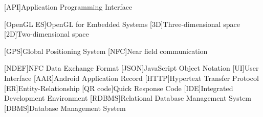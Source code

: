 [API]{Application Programming Interface}

[OpenGL ES]{OpenGL for Embedded Systems}
[3D]{Three-dimensional space}
[2D]{Two-dimensional space}

[GPS]{Global Positioning System}
[NFC]{Near field communication}

[NDEF]{NFC Data Exchange Format}
[JSON]{JavaScript Object Notation}
[UI]{User Interface}
[AAR]{Android Application Record}
[HTTP]{Hypertext Transfer Protocol}
[ER]{Entity-Relationship}
[QR code]{Quick Response Code}
[IDE]{Integrated Development Environment}
[RDBMS]{Relational Database Management System}
[DBMS]{Database Management System}